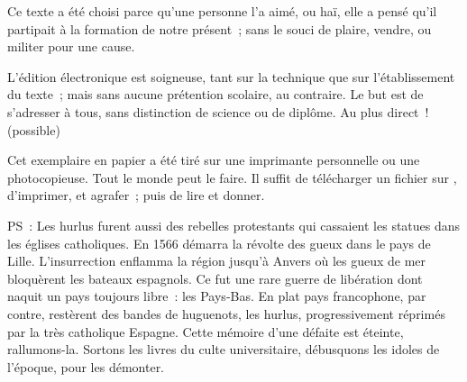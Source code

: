 \documentclass[french,twoside]{book} %
\begin{document}
  Ce texte a été choisi parce qu’une personne l’a aimé,
  ou haï, elle a pensé qu’il partipait à la formation de notre présent ;
  sans le souci de plaire, vendre, ou militer pour une cause.
  \par

  L’édition électronique est soigneuse, tant sur la technique
  que sur l’établissement du texte ; mais sans aucune prétention scolaire, au contraire.
  Le but est de s’adresser à tous, sans distinction de science ou de diplôme.
  Au plus direct ! (possible)
  \par

  Cet exemplaire en papier a été tiré sur une imprimante personnelle
   ou une photocopieuse. Tout le monde peut le faire.
  Il suffit de
  télécharger un fichier sur \href{https://hurlus.fr}{},
  d’imprimer, et agrafer ; puis de lire et donner.\par

  \bigskip

  \noindent PS : Les hurlus furent aussi des rebelles protestants qui cassaient les statues dans les églises catholiques. En 1566 démarra la révolte des gueux dans le pays de Lille. L’insurrection enflamma la région jusqu’à Anvers où les gueux de mer bloquèrent les bateaux espagnols.
  Ce fut une rare guerre de libération dont naquit un pays toujours libre : les Pays-Bas.
  En plat pays francophone, par contre, restèrent des bandes de huguenots, les hurlus, progressivement réprimés par la très catholique Espagne.
  Cette mémoire d’une défaite est éteinte, rallumons-la. Sortons les livres du culte universitaire, débusquons les idoles de l’époque, pour les démonter.
\fi
\end{document}
